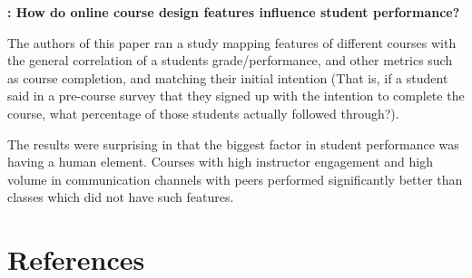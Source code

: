 \documentclass[
	letterpaper, %
]{jdf}
\begin{document}
\textbf{\cite{smith1}: How do online course design features influence student performance?}

The authors of this paper ran a study mapping features of different courses with the general correlation of a students grade/performance, and other metrics such as course completion, and matching their initial intention (That is, if a student said in a pre-course survey that they signed up with the intention to complete the course, what percentage of those students actually followed through?).

The results were surprising in that the biggest factor in student performance was having a human element. Courses with high instructor engagement and high volume in communication channels with peers performed significantly better than classes which did not have such features.

\section{References}
\printbibliography[heading=none]
\end{document}
